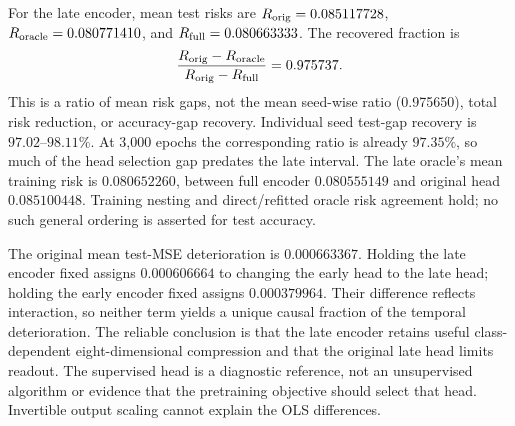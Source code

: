 For the late encoder, mean test risks are $R_{\rm orig}=0.085117728$, $R_{\rm oracle}=0.080771410$, and $R_{\rm full}=0.080663333$. The recovered fraction is
\begin{equation}
 \frac{R_{\rm orig}-R_{\rm oracle}}{R_{\rm orig}-R_{\rm full}}
 =0.975737.
\end{equation}
This is a ratio of mean risk gaps, not the mean seed-wise ratio (0.975650), total risk reduction, or accuracy-gap recovery. Individual seed test-gap recovery is $97.02$--$98.11\%$. At 3,000 epochs the corresponding ratio is already $97.35\%$, so much of the head selection gap predates the late interval. The late oracle's mean training risk is $0.080652260$, between full encoder $0.080555149$ and original head $0.085100448$. Training nesting and direct/refitted oracle risk agreement hold; no such general ordering is asserted for test accuracy.

The original mean test-MSE deterioration is $0.000663367$. Holding the late encoder fixed assigns $0.000606664$ to changing the early head to the late head; holding the early encoder fixed assigns $0.000379964$. Their difference reflects interaction, so neither term yields a unique causal fraction of the temporal deterioration. The reliable conclusion is that the late encoder retains useful class-dependent eight-dimensional compression and that the original late head limits readout. The supervised head is a diagnostic reference, not an unsupervised algorithm or evidence that the pretraining objective should select that head. Invertible output scaling cannot explain the OLS differences.
